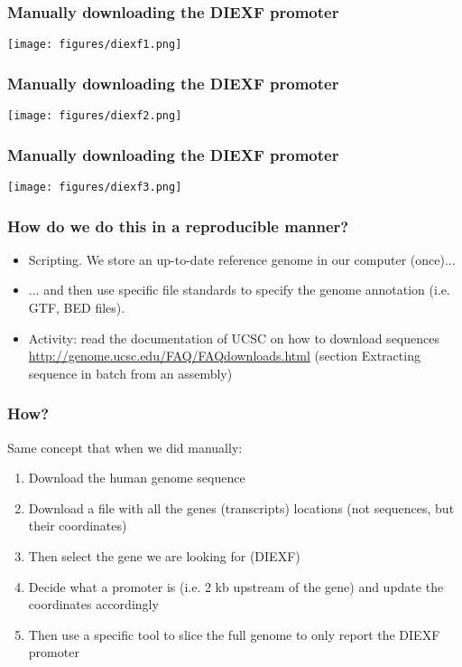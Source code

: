 \documentclass{beamer}
\begin{document}
\begin{frame}
  \frametitle{Manually downloading the DIEXF promoter}
\centering
\texttt{[image: figures/diexf1.png]}
\end{frame}


\begin{frame}
  \frametitle{Manually downloading the DIEXF promoter}
\centering
\texttt{[image: figures/diexf2.png]}
\end{frame}


\begin{frame}
  \frametitle{Manually downloading the DIEXF promoter}
\centering
\texttt{[image: figures/diexf3.png]}
\end{frame}



\begin{frame}
  \frametitle{How do we do this in a reproducible manner?}
  \begin{itemize}
  \item Scripting. We store an up-to-date reference genome in our computer (once)...
  \item ... and then use specific file standards to specify the genome annotation (i.e. GTF, BED files).
  \item Activity: read the documentation of UCSC on how to download sequences \href{http://genome.ucsc.edu/FAQ/FAQdownloads.html}{http://genome.ucsc.edu/FAQ/FAQdownloads.html} (section Extracting sequence in batch from an assembly) %
  \end{itemize}
\end{frame}

\begin{frame}
  \frametitle{How?}
  Same concept that when we did manually:
  \begin{enumerate}
  \item Download the human genome sequence
  \item Download a file with all the genes (transcripts) locations (not sequences, but their coordinates)
  \item Then select the gene we are looking for (DIEXF) 
  \item Decide what a promoter is (i.e. 2 kb upstream of the gene) and update the coordinates accordingly
  \item Then use a specific tool to slice the full genome to only report the DIEXF promoter
  \end{enumerate}
\end{frame}
\end{document}
